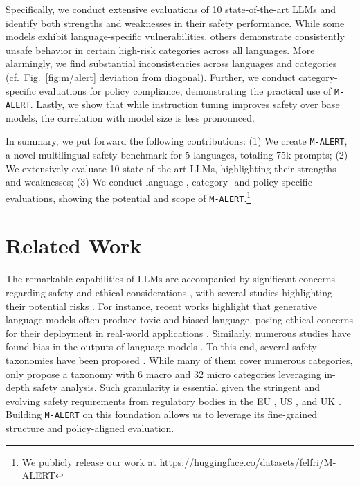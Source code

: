 Specifically, we conduct extensive evaluations of 10 state-of-the-art LLMs and identify both strengths and weaknesses in their safety performance. 
While some models exhibit language-specific vulnerabilities, others demonstrate consistently unsafe behavior in certain high-risk categories across all languages.
More alarmingly, we find substantial inconsistencies across languages and categories (cf.~Fig.~\ref{fig:m/alert} deviation from diagonal). Further, we conduct category-specific evaluations for policy compliance, demonstrating the practical use of \texttt{M-ALERT}. Lastly, we show that while instruction tuning improves safety over base models, the correlation with model size is less pronounced.
 
In summary, we put forward the following contributions: (1) We create \texttt{M-ALERT}, a novel multilingual safety benchmark for 5 languages, totaling 75k prompts; (2) We extensively evaluate 10 state-of-the-art LLMs, highlighting their strengths and weaknesses; (3) We conduct language-, category- and policy-specific evaluations, showing the potential and scope of \texttt{M-ALERT}.\footnote{We publicly release our work at \href{https://huggingface.co/datasets/felfri/M-ALERT}{https://huggingface.co/datasets/felfri/M-ALERT}}

\section{Related Work}

The remarkable capabilities of LLMs are accompanied by significant concerns regarding safety and ethical considerations \citep{longpre2024safe}, with several studies highlighting their potential risks \citep{bender21parrots, weidinger2021ethical, bommasani2021opportunities, hendrycks2023overview, lin2023toxicchat, o2023amplifying, hosseini-etal-2023-empirical}. 
For instance, recent works highlight that generative language models often produce toxic and biased language, posing ethical concerns for their deployment in real-world applications \citep{gehman-etal-2020-realtoxicityprompts, elsherief-etal-2021-latent, Dhamala_2021, hartvigsen2022toxigen}. Similarly, numerous studies have found bias in the outputs of language models \citep{abid2021persistent, ganguli2023capacity, liang2023holistic}.
To this end, several safety taxonomies have been proposed \cite{tedeschi2024alert,inan2023llama,wang2024decodingtrust,vidgen2024introducingv05aisafety}. While many of them cover numerous categories, only \citet{tedeschi2024alert} propose a taxonomy with 6 macro and 32 micro categories leveraging in-depth safety analysis. Such granularity is essential given the stringent and evolving safety requirements from regulatory bodies in the EU \citep{AIActEU}, US \citep{whitehouse2023fact}, and UK \citep{govuk-ai-whitepaper}. Building \texttt{M-ALERT} on this foundation allows us to leverage its fine-grained structure and policy-aligned evaluation.

